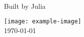 \begin{titlingpage}
\begin{center}
\vspace*{2cm}\noindent

\Huge \textbf{  \DocMainTitle  }
\\[0.6cm]

{\LARGE  Built by Julia \JuliaVersion }
\vspace*{3cm}\par\noindent

\textbf{  \DocAuthors  }
\vfill

\texttt{[image: example-image]}
\\[1.5cm]

\Large
\DocVersion
\today

\end{center}
\end{titlingpage}
